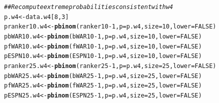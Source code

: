 \documentclass[11pt]{article}\usepackage[]{graphicx}\usepackage[]{color}
\makeatletter
\newcommand{\hlnum}[1]{\textcolor[rgb]{0.686,0.059,0.569}{#1}}%
\newcommand{\hlcom}[1]{\textcolor[rgb]{0.678,0.584,0.686}{\textit{#1}}}%
\newcommand{\hlopt}[1]{\textcolor[rgb]{0,0,0}{#1}}%
\newcommand{\hlstd}[1]{\textcolor[rgb]{0.345,0.345,0.345}{#1}}%
\newcommand{\hlkwb}[1]{\textcolor[rgb]{0.69,0.353,0.396}{#1}}%
\newcommand{\hlkwc}[1]{\textcolor[rgb]{0.333,0.667,0.333}{#1}}%
\newcommand{\hlkwd}[1]{\textcolor[rgb]{0.737,0.353,0.396}{\textbf{#1}}}%
\newenvironment{kframe}{%
 \def\at@end@of@kframe{}%
 \ifinner\ifhmode%
  \def\at@end@of@kframe{\end{minipage}}%
  \begin{minipage}{\columnwidth}%
 \fi\fi%
 \def\FrameCommand##1{\hskip\@totalleftmargin \hskip-\fboxsep
 \colorbox{shadecolor}{##1}\hskip-\fboxsep
     \hskip-\linewidth \hskip-\@totalleftmargin \hskip\columnwidth}%
 \MakeFramed {\advance\hsize-\width
   \@totalleftmargin\z@ \linewidth\hsize
   \@setminipage}}%
 {\par\unskip\endMakeFramed%
 \at@end@of@kframe}
\newenvironment{knitrout}{}{} %
\makeatother
\begin{document}
\begin{knitrout}
\begin{kframe}
\begin{alltt}
\hlcom{## Recompute extreme probabilities consistent with w4}
\hlstd{p.w4} \hlkwb{<-} \hlstd{data.w4[}\hlnum{8}\hlstd{,} \hlnum{3}\hlstd{]}
\hlstd{pranker10.w4} \hlkwb{<-} \hlkwd{pbinom}\hlstd{(ranker10} \hlopt{-} \hlnum{1}\hlstd{,} \hlkwc{p} \hlstd{= p.w4,} \hlkwc{size} \hlstd{=} \hlnum{10}\hlstd{,} \hlkwc{lower} \hlstd{=} \hlnum{FALSE}\hlstd{)}
\hlstd{pbWAR10.w4}   \hlkwb{<-} \hlkwd{pbinom}\hlstd{(bWAR10} \hlopt{-} \hlnum{1}\hlstd{,} \hlkwc{p} \hlstd{= p.w4,} \hlkwc{size} \hlstd{=} \hlnum{10}\hlstd{,} \hlkwc{lower} \hlstd{=} \hlnum{FALSE}\hlstd{)}
\hlstd{pfWAR10.w4}   \hlkwb{<-} \hlkwd{pbinom}\hlstd{(fWAR10} \hlopt{-} \hlnum{1}\hlstd{,} \hlkwc{p} \hlstd{= p.w4,} \hlkwc{size} \hlstd{=} \hlnum{10}\hlstd{,} \hlkwc{lower} \hlstd{=} \hlnum{FALSE}\hlstd{)}
\hlstd{pESPN10.w4}   \hlkwb{<-} \hlkwd{pbinom}\hlstd{(ESPN10} \hlopt{-} \hlnum{1}\hlstd{,} \hlkwc{p} \hlstd{= p.w4,} \hlkwc{size} \hlstd{=} \hlnum{10}\hlstd{,} \hlkwc{lower} \hlstd{=} \hlnum{FALSE}\hlstd{)}
\hlstd{pranker25.w4} \hlkwb{<-} \hlkwd{pbinom}\hlstd{(ranker25} \hlopt{-} \hlnum{1}\hlstd{,} \hlkwc{p} \hlstd{= p.w4,} \hlkwc{size} \hlstd{=} \hlnum{25}\hlstd{,} \hlkwc{lower} \hlstd{=} \hlnum{FALSE}\hlstd{)}
\hlstd{pbWAR25.w4}   \hlkwb{<-} \hlkwd{pbinom}\hlstd{(bWAR25} \hlopt{-} \hlnum{1}\hlstd{,} \hlkwc{p} \hlstd{= p.w4,} \hlkwc{size} \hlstd{=} \hlnum{25}\hlstd{,} \hlkwc{lower} \hlstd{=} \hlnum{FALSE}\hlstd{)}
\hlstd{pfWAR25.w4}   \hlkwb{<-} \hlkwd{pbinom}\hlstd{(fWAR25} \hlopt{-} \hlnum{1}\hlstd{,} \hlkwc{p} \hlstd{= p.w4,} \hlkwc{size} \hlstd{=} \hlnum{25}\hlstd{,} \hlkwc{lower} \hlstd{=} \hlnum{FALSE}\hlstd{)}
\hlstd{pESPN25.w4}   \hlkwb{<-} \hlkwd{pbinom}\hlstd{(ESPN25} \hlopt{-} \hlnum{1}\hlstd{,} \hlkwc{p} \hlstd{= p.w4,} \hlkwc{size} \hlstd{=} \hlnum{25}\hlstd{,} \hlkwc{lower} \hlstd{=} \hlnum{FALSE}\hlstd{)}
\end{alltt}
\end{kframe}
\end{knitrout}
\end{document}
